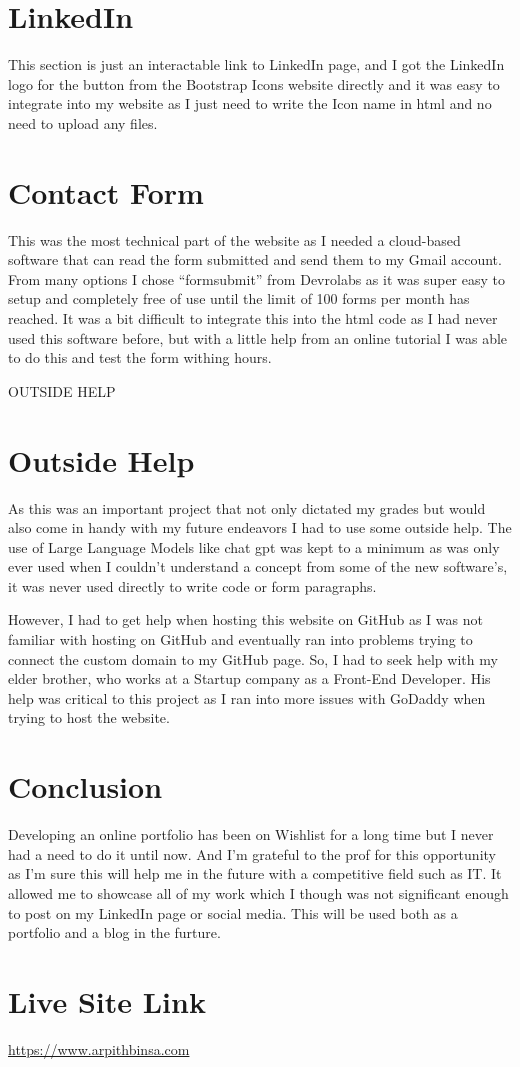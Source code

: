 \documentclass[12pt]{article}
\begin{document}
\section*{LinkedIn}
This section is just an interactable link to LinkedIn page, and I got the LinkedIn logo for the button from the Bootstrap Icons website directly and it was easy to integrate into my website as I just need to write the Icon name in html and no need to upload any files.

\section*{Contact Form}
This was the most technical part of the website as I needed a cloud-based software that can read the form submitted and send them to my Gmail account. From many options I chose “formsubmit” from Devrolabs as it was super easy to setup and completely free of use until the limit of 100 forms per month has reached. It was a bit difficult to integrate this into the html code as I had never used this software before, but with a little help from an online tutorial I was able to do this and test the form withing hours.

OUTSIDE HELP

\section*{Outside Help}
As this was an important project that not only dictated my grades but would also come in handy with my future endeavors I had to use some outside help. 
The use of Large Language Models like chat gpt was kept to a minimum as was only ever used when I couldn’t understand a concept from some of the new software’s, it was never used directly to write code or form paragraphs.

However, I had to get help when hosting this website on GitHub as I was not familiar with hosting on GitHub and eventually ran into problems trying to connect the custom domain to my GitHub page. So, I had to seek help with my elder brother, who works at a Startup company as a Front-End Developer. His help was critical to this project as I ran into more issues with GoDaddy when trying to host the website.

\section*{Conclusion}
Developing an online portfolio has been on Wishlist for a long time but I never had a need to do it until now. And I’m grateful to the prof for this opportunity as I’m sure this will help me in the future with a competitive field such as IT. It allowed me to showcase all of my work which I though was not significant enough to post on my LinkedIn page or social media. This will be used both as a portfolio and a blog in the furture.
\section*{Live Site Link}
\href{https://www.arpithbinsa.com}{https://www.arpithbinsa.com}
\end{document}
